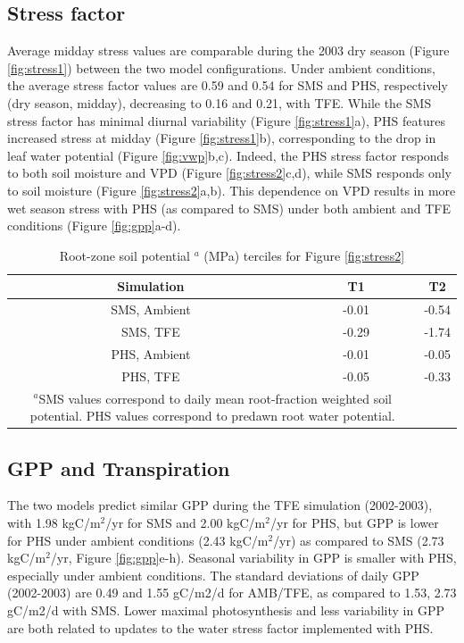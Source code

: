 \documentclass[draft,linenumbers]{agujournal}
\begin{document}
\subsection{Stress factor}
    
    Average midday stress values are comparable during the 2003 dry season (Figure \ref{fig:stress1}) between the two model configurations.
    Under ambient conditions, the average stress factor values are 0.59 and 0.54 for SMS and PHS, respectively (dry season, midday), 
    decreasing to 0.16 and 0.21, with TFE.
    While the SMS stress factor has minimal diurnal variability (Figure \ref{fig:stress1}a),
    PHS features increased stress at midday (Figure \ref{fig:stress1}b), corresponding to the drop in leaf water potential (Figure \ref{fig:vwp}b,c).
    Indeed, the PHS stress factor responds to both soil moisture and VPD (Figure \ref{fig:stress2}c,d), while SMS responds only to soil moisture (Figure \ref{fig:stress2}a,b).
    This dependence on VPD results in more wet season stress with PHS (as compared to SMS) under both ambient and TFE conditions (Figure \ref{fig:gpp}a-d).

\begin{table}
\caption{Root-zone soil potential $^a$ (MPa) terciles for Figure \ref{fig:stress2}}
\label{tab:tercile}
\centering
\begin{tabular}{c c c }
Simulation & T1 & T2 \\
\hline
SMS, Ambient & -0.01 & -0.54 \\
SMS, TFE & -0.29 & -1.74 \\
PHS, Ambient & -0.01 & -0.05 \\
PHS, TFE & -0.05 & -0.33 \\
\hline
\multicolumn{2}{p{.5\linewidth}}{$^{a}$SMS values correspond to daily mean root-fraction weighted soil potential.
PHS values correspond to predawn root water potential.}
\end{tabular}
\end{table}


\subsection{GPP and Transpiration}
    The two models predict similar GPP during the TFE simulation (2002-2003), with 1.98 kgC/m$^2$/yr for SMS and 2.00 kgC/m$^2$/yr for PHS, 
    but GPP is lower for PHS under ambient conditions (2.43 kgC/m$^2$/yr) as compared to SMS (2.73 kgC/m$^2$/yr, Figure \ref{fig:gpp}e-h).
    Seasonal variability in GPP is smaller with PHS, especially under ambient conditions. 
    The standard deviations of daily GPP (2002-2003) are 0.49 and 1.55 gC/m2/d for AMB/TFE, 
    as compared to 1.53, 2.73 gC/m2/d with SMS.
    Lower maximal photosynthesis and less variability in GPP are both related to updates to the water stress factor implemented with PHS.
\end{document}
